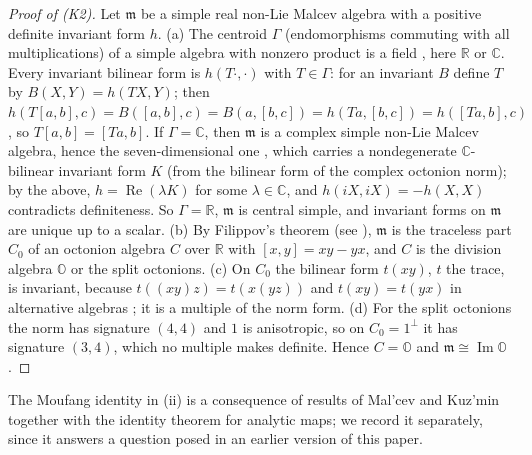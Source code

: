 \documentclass[11pt,reqno]{amsart}
\theoremstyle{definition}
\theoremstyle{remark}
\numberwithin{equation}{section}
\newcommand{\R}{\mathbb{R}}
\newcommand{\C}{\mathbb{C}}
\newcommand{\re}{\operatorname{Re}}
\newcommand{\im}{\operatorname{Im}}
\begin{document}
\begin{proof}[Proof of (K2)]
Let $\mathfrak m$ be a simple real non-Lie Malcev algebra with a positive definite invariant form $h$.  (a) The centroid $\Gamma$
(endomorphisms commuting with all multiplications) of a simple algebra with nonzero product is a field \cite[Ch.~II]{Schafer66},
here $\R$ or $\C$.  Every invariant bilinear form is $h(T\cdot,\cdot)$ with $T\in\Gamma$: for an invariant $B$ define $T$ by
$B(X,Y)=h(TX,Y)$; then $h(T[a,b],c)=B([a,b],c)=B(a,[b,c])=h(Ta,[b,c])=h([Ta,b],c)$, so $T[a,b]=[Ta,b]$.  If $\Gamma=\C$, then $\mathfrak m$
is a complex simple non-Lie Malcev algebra, hence the seven-dimensional one \cite{Sagle62,Kuzmin68}, which carries a
nondegenerate $\C$-bilinear invariant form $K$ (from the bilinear form of the complex octonion norm); by the above,
$h=\re(\lambda K)$ for some $\lambda\in\C$, and $h(iX,iX)=-h(X,X)$ contradicts definiteness.  So $\Gamma=\R$, $\mathfrak m$ is central simple,
and invariant forms on $\mathfrak m$ are unique up to a scalar.  (b) By Filippov's theorem \cite{Filippov76} (see
\cite[\S2]{Loginov01}), $\mathfrak m$ is the traceless part $C_0$ of an octonion algebra $C$ over $\R$ with $[x,y]=xy-yx$, and $C$ is
the division algebra $\mathbb O$ or the split octonions.  (c) On $C_0$ the bilinear form $t(xy)$, $t$ the trace, is invariant,
because $t((xy)z)=t(x(yz))$ and $t(xy)=t(yx)$ in alternative algebras \cite{Schafer66}; it is a multiple of the norm form.
(d) For the split octonions the norm has signature $(4,4)$ and $1$ is anisotropic, so on $C_0=1^\perp$ it has signature $(3,4)$,
which no multiple makes definite.  Hence $C=\mathbb O$ and $\mathfrak m\cong\im\mathbb O$.
\end{proof}

The Moufang identity in (ii) is a consequence of results of Mal'cev and Kuz'min together with the identity theorem for analytic
maps; we record it separately, since it answers a question posed in an earlier version of this paper.
\end{document}
